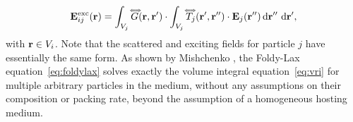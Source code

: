 \begin{equation}
\mathbf{E}^\text{exc}_{ij}(\mathbf{r}) = \int_{V_j} \accentset{\Longleftrightarrow}{G}(\mathbf{r},\mathbf{r}')\cdot\int_{V_j} \accentset{\Longleftrightarrow}{T}_j(\mathbf{r}',\mathbf{r}'')\cdot \mathbf{E}_j(\mathbf{r}'') \,\text{d}\mathbf{r}''\,\,\text{d}\mathbf{r}',
\label{eq:excfield}
\end{equation}
%
with $\mathbf{r}\in V_i$. Note that the scattered and exciting fields for particle $j$ have essentially the same form. 
%
As shown by Mishchenko , the Foldy-Lax equation~\eqref{eq:foldylax} solves exactly the volume integral equation~\eqref{eq:vri} for multiple arbitrary particles in the medium, without any assumptions on their composition or packing rate, beyond the assumption of a homogeneous hosting medium.


